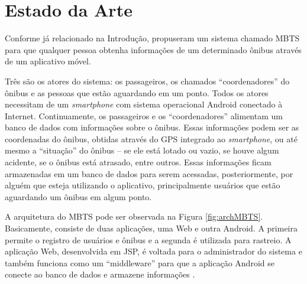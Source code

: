 \section{Estado da Arte}

Conforme já relacionado na Introdução,  propuseram um sistema chamado MBTS para que qualquer pessoa obtenha informações de um determinado ônibus através de um aplicativo móvel. 

Três são os atores do sistema: os passageiros, os chamados ``coordenadores'' do ônibus e as pessoas que estão aguardando em um ponto. Todos os atores necessitam de um \textit{smartphone} com sistema operacional Android conectado à Internet. Continuamente, os passageiros e os ``coordenadores'' alimentam um banco de dados com informações sobre o ônibus. Essas informações podem ser as coordenadas do ônibus, obtidas através do GPS integrado ao \emph{smartphone}, ou até mesmo a ``situação'' do ônibus -- se ele está lotado ou vazio, se houve algum acidente, se o ônibus está atrasado, entre outros. Essas informações ficam armazenadas em um banco de dados para serem acessadas, posteriormente, por alguém que esteja utilizando o aplicativo, principalmente usuários que estão aguardando um ônibus em algum ponto. 



A arquitetura do MBTS pode ser observada na Figura \ref{fig:archMBTS}. Basicamente, consiste de duas aplicações, uma Web e outra Android. A primeira permite o registro de usuários e ônibus e a segunda é utilizada para rastreio. A aplicação Web, desenvolvida em JSP, é voltada para o administrador do sistema e também funciona como um ``middleware'' para que a aplicação Android se conecte ao banco de dados e armazene informações \cite{sujatha}.


